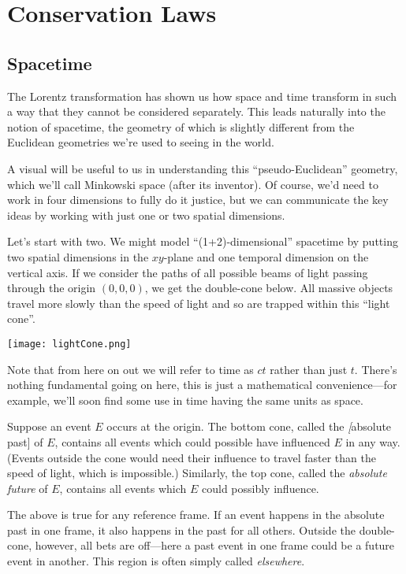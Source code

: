 \documentclass[../p023main.tex]{subfiles}
\begin{document}
\chapter{Conservation Laws}
\section{Spacetime}
The Lorentz transformation has shown us how space and time transform in such a way that they cannot be considered separately.
This leads naturally into the notion of spacetime, the geometry of which is slightly different from the Euclidean geometries we're used to seeing in the world.

A visual will be useful to us in understanding this ``pseudo-Euclidean'' geometry, which we'll call Minkowski space (after its inventor).
Of course, we'd need to work in four dimensions to fully do it justice, but we can communicate the key ideas by working with just one or two spatial dimensions.

Let's start with two.
We might model ``(1+2)-dimensional'' spacetime by putting two spatial dimensions in the $xy$-plane and one temporal dimension on the vertical axis.
If we consider the paths of all possible beams of light passing through the origin $(0,0,0)$, we get the double-cone below.
All massive objects travel more slowly than the speed of light and so are trapped within this ``light cone''.
\begin{center}
    \texttt{[image: lightCone.png]}
\end{center}
Note that from here on out we will refer to time as $ct$ rather than just $t$.
There's nothing fundamental going on here, this is just a mathematical convenience---for example, we'll soon find some use in time having the same units as space.

Suppose an event $E$ occurs at the origin.
The bottom cone, called the \textit[absolute past] of $E$, contains all events which could possible have influenced $E$ in any way.
(Events outside the cone would need their influence to travel faster than the speed of light, which is impossible.)
Similarly, the top cone, called the \textit{absolute future} of $E$, contains all events which $E$ could possibly influence.

The above is true for any reference frame.
If an event happens in the absolute past in one frame, it also happens in the past for all others.
Outside the double-cone, however, all bets are off---here a past event in one frame could be a future event in another.
This region is often simply called \textit{elsewhere}.
\end{document}
